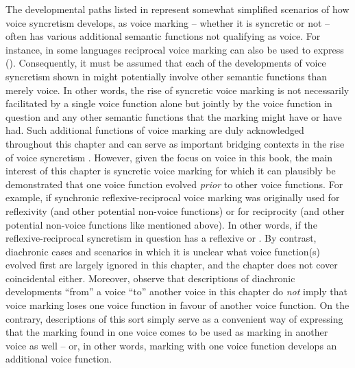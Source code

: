 The developmental paths listed in  represent somewhat simplified scenarios of how voice syncretism develops, as voice marking -- whether it is syncretic or not -- often has various additional semantic functions not qualifying as voice. For instance, in some languages reciprocal voice marking can also be used to express  (). Consequently, it must be assumed that each of the developments of voice syncretism shown in  might potentially involve other semantic functions than merely voice. In other words, the rise of syncretic voice marking is not necessarily facilitated by a single voice function alone but jointly by the voice function in question and any other semantic functions that the marking might have or have had. Such additional functions of voice marking are duly acknowledged throughout this chapter and can serve as important bridging contexts in the rise of voice syncretism \citep{heine:kuteva:2007}. However, given the focus on voice in this book, the main interest of this chapter is syncretic voice marking for which it can plausibly be demonstrated that one voice function evolved \textit{prior} to other voice functions. For example, if synchronic reflexive-reciprocal voice marking was originally used for reflexivity (and other potential non-voice functions) or for reciprocity (and other potential non-voice functions like  mentioned above). In other words, if the reflexive-reciprocal syncretism in question has a reflexive or . By contrast, diachronic cases and scenarios in which it is unclear what voice function(s) evolved first are largely ignored in this chapter, and the chapter does not cover coincidental  either. Moreover, observe that descriptions of diachronic developments “from” a voice “to” another voice in this chapter do \textit{not} imply that voice marking loses one voice function in favour of another voice function. On the contrary, descriptions of this sort simply serve as a convenient way of expressing that the marking found in one voice comes to be used as marking in another voice as well -- or, in other words, marking with one voice function develops an additional voice function. 

